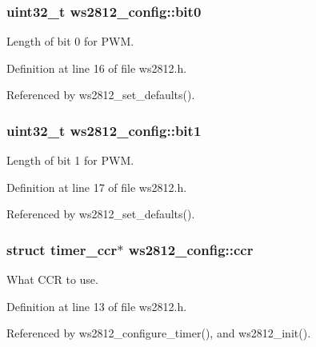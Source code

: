\subsubsection[{bit0}]{\setlength{\rightskip}{0pt plus 5cm}uint32\+\_\+t ws2812\+\_\+config\+::bit0}\label{structws2812__config_a22370b6dc4cdf5c6e25c4c155a275046}


Length of bit 0 for P\+W\+M. 



Definition at line 16 of file ws2812.\+h.



Referenced by ws2812\+\_\+set\+\_\+defaults().

\hypertarget{structws2812__config_a410b277b06bbb4ff2f8fd8c6fb5bc994}{}
\subsubsection[{bit1}]{\setlength{\rightskip}{0pt plus 5cm}uint32\+\_\+t ws2812\+\_\+config\+::bit1}\label{structws2812__config_a410b277b06bbb4ff2f8fd8c6fb5bc994}


Length of bit 1 for P\+W\+M. 



Definition at line 17 of file ws2812.\+h.



Referenced by ws2812\+\_\+set\+\_\+defaults().

\hypertarget{structws2812__config_a0c4b50ce11c055c0457af653c4951ee9}{}
\subsubsection[{ccr}]{\setlength{\rightskip}{0pt plus 5cm}struct {\bf timer\+\_\+ccr}$\ast$ ws2812\+\_\+config\+::ccr}\label{structws2812__config_a0c4b50ce11c055c0457af653c4951ee9}


What C\+C\+R to use. 



Definition at line 13 of file ws2812.\+h.



Referenced by ws2812\+\_\+configure\+\_\+timer(), and ws2812\+\_\+init().

\hypertarget{structws2812__config_a15634a419d7f20275ec1e6ba1215920b}{}
